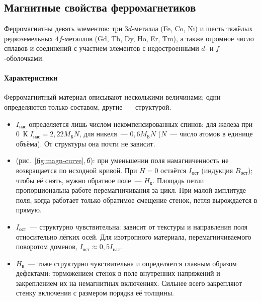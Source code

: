 \subsection{Магнитные свойства ферромагнетиков}\label{ssec:ferro}

Ферромагнитны девять элементов: три $3d$-металла (Fe, Co, Ni) и шесть
тяжёлых редкоземельных $4f$-металлов (Gd, Tb, Dy, Ho, Er, Tm), а также
огромное число сплавов и соединений с участием элементов с недостроенными
$d$- и $f$-оболочками.

\paragraph{Характеристики}
Ферромагнитный материал описывают несколькими величинами; одни
определяются только составом, другие~— структурой.
\begin{itemize}
\item {} $I_\text{нас}$ определяется лишь
числом некомпенсированных спинов: для железа при 0~К
$I_\text{нас}=2{,}22M_\text{Б}N$, для никеля~— $0{,}6M_\text{Б}N$ ($N$~— число
атомов в единице объёма). От структуры она почти не зависит.
\item {} (рис.~\ref{fig:magn-curve},\,\textit{б}): при
уменьшении поля намагниченность не возвращается по исходной кривой. При
$H=0$ остаётся  $I_\text{ост}$ (индукция
$B_\text{ост}$); чтобы её снять, нужно обратное поле~—  $H_\text{к}$. Площадь петли пропорциональна работе
перемагничивания за цикл. При малой амплитуде поля, когда работает
только обратимое смещение стенок, петля вырождается в прямую.
\item $I_\text{ост}$~— структурно чувствительна: зависит от текстуры и
направления поля относительно лёгких осей. Для изотропного материала,
перемагничиваемого поворотом доменов, $I_\text{ост}\approx0{,}5I_\text{нас}$.
\item $H_\text{к}$~— тоже структурно чувствительна и определяется главным
образом дефектами: торможением стенок в поле внутренних напряжений и
закреплением их на немагнитных включениях. Сильнее всего закрепляют
стенку включения с размером порядка её толщины.
\end{itemize}

